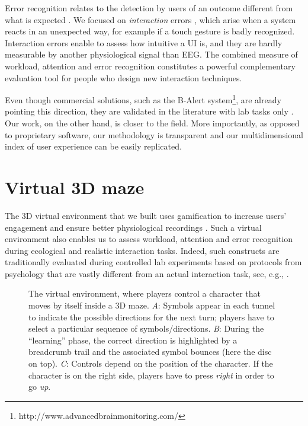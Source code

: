 \documentclass[]{sigchi}
\begin{document}
Error recognition relates to the detection by users of an outcome
different from what is expected \citep{Nieuwenhuis2001}. We focused on
\emph{interaction} errors \citep{Ferrez2008}, which arise when a system
reacts in an unexpected way, for example if a touch gesture is badly
recognized. Interaction errors enable to assess how intuitive a UI is,
and they are hardly measurable by another physiological signal than EEG.
The combined measure of workload, attention and error recognition
constitutes a powerful complementary evaluation tool for people who
design new interaction techniques.

Even though commercial solutions, such as the B-Alert system\footnote{http://www.advancedbrainmonitoring.com/},
are already pointing this direction, they are validated in the
literature with lab tasks only \citep{Berka2007}. Our work, on the other
hand, is closer to the field. More importantly, as opposed to
proprietary software, our methodology is transparent and our
multidimensional index of user experience can be easily replicated.

\section{Virtual 3D maze}\label{virtual-3d-maze}

The 3D virtual environment that we built uses gamification
\citep{Deterding2011} to increase users' engagement and ensure better
physiological recordings \citep{Flatla2011}. Such a virtual environment
also enables us to assess workload, attention and error recognition
during ecological and realistic interaction tasks. Indeed, such
constructs are traditionally evaluated during controlled lab experiments
based on protocols from psychology that are vastly different from an
actual interaction task, see, e.g., \citep{Grimes2008}.

\begin{figure*}
\centering
{}
\caption{The virtual environment, where players control a character that
moves by itself inside a 3D maze. \emph{A}: Symbols appear in each
tunnel to indicate the possible directions for the next turn; players
have to select a particular sequence of symbols/directions. \emph{B}:
During the ``learning'' phase, the correct direction is highlighted by a
breadcrumb trail and the associated symbol bounces (here the disc on
top). \emph{C}: Controls depend on the position of the character. If the
character is on the right side, players have to press \emph{right} in
order to go \emph{up}.}\label{fig:maze}
\end{figure*}
\end{document}
